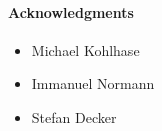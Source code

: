 \documentclass{llncs}
\begin{document}





\paragraph{Acknowledgments}
\label{sec:ack}

\begin{itemize}
\item Michael Kohlhase
\item Immanuel Normann
\item Stefan Decker
\end{itemize}





\ednotemessage
\end{document}
